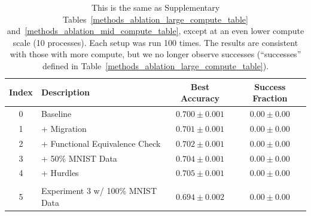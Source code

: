 {\begin{table}[!ht]
\caption{This is the same as Supplementary Tables~\ref{methods_ablation_large_compute_table} and~\ref{methods_ablation_mid_compute_table}, except at an even lower compute scale (10 processes). Each setup was run 100 times. The results are consistent with those with more compute, but we no longer observe successes (``successes'' defined in Table~\ref{methods_ablation_large_compute_table}).}
\label{methods_ablation_low_compute_table}
\begin{center}
\begin{small}
\begin{sc}
\begin{tabular}{clcc}
\toprule
Index & Description & Best Accuracy & Success Fraction \\
\midrule
0 & Baseline & $0.700 \pm 0.001$ & $0.00 \pm 0.00$ \\
1 & + Migration & $0.701 \pm 0.001$ & $0.00 \pm 0.00$ \\
2 & + Functional Equivalence Check & $0.702 \pm 0.001$ & $0.00 \pm 0.00$ \\
3 & + 50\% MNIST Data & $0.704 \pm 0.001$ & $0.00 \pm 0.00$ \\
4& + Hurdles & $0.705 \pm 0.001$ & $0.00 \pm 0.00$ \\
\\
5 & Experiment 3 w/ 100\% MNIST Data & $0.694 \pm 0.002$ & $0.00 \pm 0.00$ \\
\bottomrule
\end{tabular}
\end{sc}
\end{small}
\end{center}
\end{table}

\pagebreak{}

}  %

